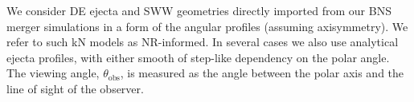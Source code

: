 



We consider \ac{DE} ejecta and \ac{SWW} geometries directly imported from 
our \ac{BNS} merger simulations in a form of the angular profiles 
(assuming axisymmetry). We refer to such \ac{kN} models as \ac{NR}-informed. 
In several cases we also use analytical ejecta profiles, with 
either smooth of step-like dependency on the polar angle.
%
The viewing angle, $\theta_{\text{obs}}$, is measured as the angle between the 
polar axis and the line of sight of the observer.













